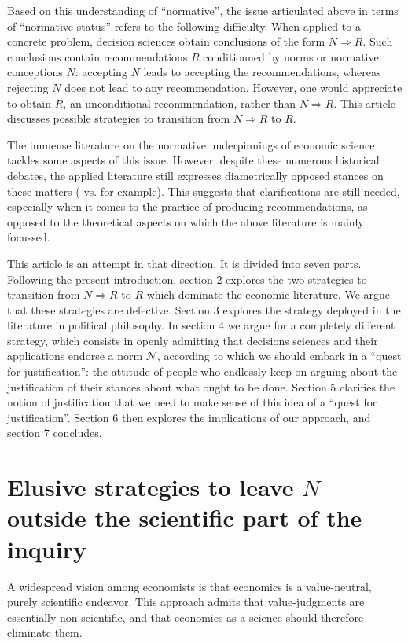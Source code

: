 \documentclass[preprint, french, english, 11pt, authoryear]{elsarticle}%
\newcommand{\adv}{\mathscr{N}}
\begin{document}
Based on this understanding of ``normative'', the issue articulated above in terms of ``normative status'' refers to the following difficulty. When applied to a concrete problem, decision sciences obtain conclusions of the form $N ⇒ R$. Such conclusions contain recommendations $R$ conditionned by norms or normative conceptions $N$: accepting  $N$ leads to accepting the recommendations, whereas rejecting $N$ does not lead to any recommendation. However, one would appreciate to obtain $R$, an unconditional recommendation, rather than $N ⇒ R$. This article discusses possible strategies to transition from $N ⇒ R$ to $R$.

The immense literature on the normative underpinnings of economic science \citep{buchanan_positive_1959,sen_nature_1967,dwyer_scientific_1985, heath_value_1994,mongin_value_2006,baujard_value_2013} tackles some aspects of this issue. However, despite these numerous historical debates, the applied literature still expresses diametrically opposed stances on these matters (\citet{spash_bulldozing_2015} vs. \citet{scharks_dont_2016} for example). This suggests that clarifications are still needed, especially when it comes to the practice of producing recommendations, as opposed to the theoretical aspects on which the above literature is mainly focussed.

This article is an attempt in that direction. It is divided into seven parts. Following the present introduction, section 2 explores the two strategies to transition from $N ⇒ R$ to $R$ which dominate the economic literature. We argue that these strategies are defective. Section 3 explores the strategy deployed in the literature in political philosophy. In section 4 we argue for a completely different strategy, which consists in openly admitting that decisions sciences and their applications endorse a norm $\adv$, according to which we should embark in a ``quest for justification'': the attitude of people who endlessly keep on arguing about the justification of their stances about what ought to be done. Section 5 clarifies the notion of justification that we need to make sense of this idea of a ``quest for justification''. Section 6 then explores the implications of our approach, and section 7 concludes.

\section{\texorpdfstring{Elusive strategies to leave $N$ outside the scientific part of the inquiry}{Elusive strategies to leave N outside the scientific part of the inquiry}}
A widespread vision among economists is that economics is a value-neutral, purely scientific endeavor. This approach admits that value-judgments are essentially non-scientific, and that economics as a science should therefore eliminate them.
\end{document}
